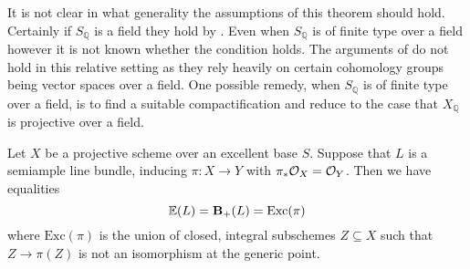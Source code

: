 \begin{remark}
	It is not clear in what generality the assumptions of this theorem should hold. Certainly if $S_{\mathbb{Q}}$ is a field they hold by \cite{birkar2017augmented}. Even when $S_{\mathbb{Q}}$ is of finite type over a field however it is not known whether the condition holds. The arguments of \cite{birkar2017augmented} do not hold in this relative setting as they rely heavily on certain cohomology groups being vector spaces over a field. One possible remedy, when $S_{\mathbb{Q}}$ is of finite type over a field, is to find a suitable compactification and reduce to the case that $X_{\mathbb{Q}}$ is projective over a field.
\end{remark}


\begin{lemma}\label{Case:SA}
	Let $X$ be a projective scheme over an excellent base $S$. Suppose that $L$ is a semiample line bundle, inducing $\pi:X \to Y$ with $\pi_{*}\mathcal{O}_{X}=\mathcal{O}_{Y}$. Then we have equalities \[\mathbb{E}(L)=\mathbf{B}_{+}(L)=\text{Exc}(\pi)\]
	where $\text{Exc}(\pi)$ is the union of closed, integral subschemes $Z \subseteq X$ such that $Z \to \pi(Z)$ is not an isomorphism at the generic point.
\end{lemma}


